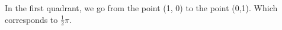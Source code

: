 \documentclass[preview]{standalone}
\begin{document}
\begin{center}
In the first quadrant, we go from the point (1, 0) to the point (0,1). Which corresponds to $\frac{1}{2} \pi$.
\end{center}
\end{document}
